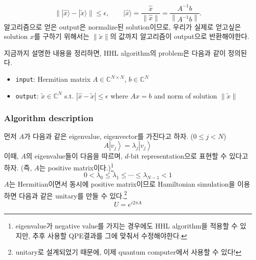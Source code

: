 \begin{equation*}
  \||\hat{x}\rangle-|\tilde{x}\rangle \| \leq \epsilon, \qquad |\hat x\rangle= \frac{\hat x}{\|\hat x\|} = \frac{A^{-1} b}{\left\|A^{-1} b\right\|} .
\end{equation*}
알고리즘으로 얻은 output은 normalize된 solution이므로, 우리가 실제로 얻고싶은 solution $x$를 구하기 위해서는 $\|\tilde x\|$의 값까지 알고리즘이 output으로 반환해야한다. 

\vspace{1em}

지금까지 설명한 내용을 정리하면, HHL algorithm의 problem은 다음과 같이 정의된다. 
\begin{itemize}
  \item \texttt{input}: Hermitian matrix $A \in \mathbb C^{N\times N}$, $b \in \mathbb C^N$
  \item \texttt{output}: $\tilde x \in \mathbb C^N$ s.t. $|\hat x - \tilde x| \le \epsilon$ where $Ax = b$ and norm of solution $\|\tilde x\|$
\end{itemize}

\subsubsection{Algorithm description}
먼저 $A$가 다음과 같은 eigenvalue, eigenvector를 가진다고 하자. ($0 \le j < N$)
\begin{equation*}
  A\left|v_j\right\rangle=\lambda_j\left|v_j\right\rangle
\end{equation*}
이때, $A$의 eigenvalue들이 다음을 따르며, $d$-bit representation으로 표현할 수 있다고 하자. (즉, $A$는 positive matrix이다.)\footnote{eigenvalue가 negative value를 가지는 경우에도 HHL algorithm을 적용할 수 있지만, 추후 사용할 QPE결과를 그에 맞춰서 수정해야한다.}
\begin{equation*}
  0<\lambda_0 \leq \lambda_1 \leq \cdots \leq \lambda_{N-1}<1
\end{equation*}
$A$는 Hermitian이면서 동시에 positive matrix이므로 Hamiltonian simulation을 이용하면 다음과 같은 unitary를 만들 수 있다.\footnote{unitary로 설계되었기 때문에, 이제 quantum computer에서 사용할 수 있다!}
\begin{equation*}
  U=e^{i 2 \pi A}
\end{equation*}

